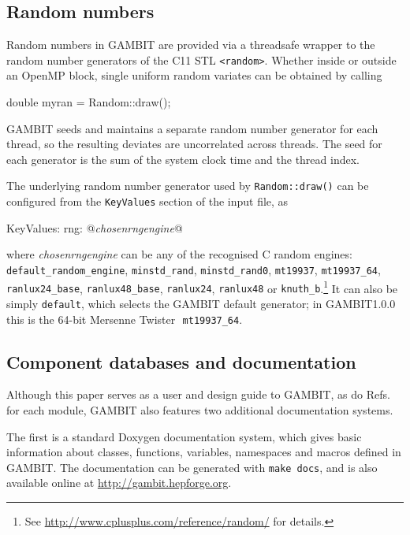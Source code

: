 \documentclass[pdftex,twocolumn,epjc3_preprint,runningheads]{svjour3}
\renewcommand{\_}{\discretionary{\underscore}{}{\underscore}}
\newcommand\cpp[1]{{\lstinline!#1!}}  %
\newcommand\yaml[1]{{\lstset{style=yaml}\lstinline!#1!\lstset{style=cpp}}}
\newcommand\term[1]{{\lstset{style=terminal}\lstinline!#1!\lstset{style=cpp}}}
\newcommand{\metavarf}[1]{\textit{\color{darkgreen}\footnotesize\textrm{#1}}}
\newcommand{\metavar}{\metavarf}
\newcommand{\gambit}{\textsf{GAMBIT}\xspace}
\newcommand{\GB}{\gambit}
\newcommand{\omp}{\textsf{OpenMP}\xspace}
\newcommand\xx{\raisebox{0.2ex}{\smaller ++}\xspace}
\newcommand\Cpp{\textsf{C\xx}\xspace}
\newcommand\Cppeleven{\textsf{C\raisebox{0.2ex}{\smaller ++}11}\xspace}
\begin{document}
\subsection{Random numbers}
\label{random numbers}

Random numbers in \GB are provided via a threadsafe wrapper to the random number generators of the \Cppeleven STL \cpp{<random>}.  Whether inside or outside an \omp block, single uniform random variates can be obtained by calling
\begin{lstcpp}
double myran = Random::draw();
\end{lstcpp}
\GB seeds and maintains a separate random number generator for each thread, so the resulting deviates are uncorrelated across threads.  The seed for each generator is the sum of the system clock time and the thread index.

The underlying random number generator used by \cpp{Random::draw()} can be configured from the \yaml{KeyValues} section of the input file, as
\begin{lstyaml}
KeyValues:
  rng: @\metavar{chosen\_rng\_engine}@
\end{lstyaml}
where \metavar{chosen\_rng\_engine} can be any of the recognised \Cpp random engines: \cpp{default_random_engine}, \mbox{\cpp{minstd_rand},} \cpp{minstd_rand0}, \cpp{mt19937}, \cpp{mt19937_64}, \cpp{ranlux24_base}, \cpp{ranlux48_base}, \cpp{ranlux24}, \cpp{ranlux48} or \cpp{knuth_b}.\footnote{See \href{http://www.cplusplus.com/reference/random/}{http://www.cplusplus.com/reference/random/} for details.}  It can also be simply \yaml{default}, which selects the \GB default generator; in \GB \textsf{1.0.0} this is the 64-bit Mersenne Twister\ \,\cpp{mt19937_64}.

\subsection{Component databases and documentation}
\label{component_databases}

Although this paper serves as a user and design guide to \GB, as do Refs.\ \cite{DarkBit,ColliderBit,ScannerBit,FlavBit,SDPBit} for each module, \GB also features two additional documentation systems.

The first is a standard \textsf{Doxygen} documentation system, which gives basic information about classes, functions, variables, namespaces and macros defined in \GB.  The documentation can be generated with \term{make docs}, and is also available online at \href{http://gambit.hepforge.org}{http://gambit.hepforge.org}.
\end{document}
